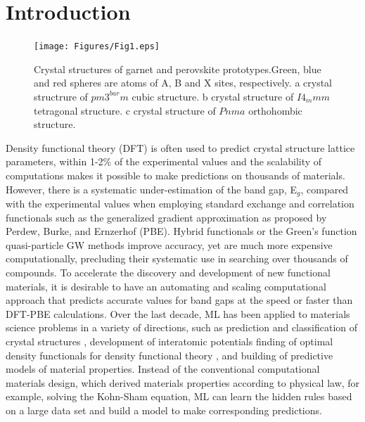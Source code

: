 \documentclass[twocolumn,
superscriptaddress,
 amsmath,amssymb,
 aps, citeautoscript,
prb,
]{revtex4-1}
\begin{document}
\maketitle


\section{Introduction}
 
 \begin{figure}[ht]
\begin{center}
\texttt{[image: Figures/Fig1.eps]}
\end{center}
\caption{ Crystal structures of garnet and perovskite prototypes.Green, blue and red spheres are atoms of A, B and X sites, respectively. a crystal structrure of $pm3^{bar}m$ cubic structure. b crystal structure of $I4_mmm$ tetragonal structure. c crystal structure of $Pnma$ orthohombic structure.}
\label{fig1}
\end{figure}

Density functional theory (DFT)\cite{Kohn1964,Kohn1965}  is often used to predict crystal structure lattice parameters, within 1-2\% of the experimental values and the scalability of computations makes it possible to make predictions on thousands of materials.  However, there is a systematic under-estimation of the band gap, E$_g$, compared with the experimental values when employing standard exchange and correlation functionals such as the generalized gradient approximation as proposed by Perdew, Burke, and Ernzerhof (PBE).  Hybrid functionals  \cite{Heyd2003,Heyd2006} or the Green’s function quasi-particle GW methods \cite{Luoie1996,Kresse2006} improve accuracy, yet are much more expensive computationally, precluding their systematic use in searching over thousands of compounds. To accelerate the discovery and development of new functional materials, it is desirable to have an automating and scaling computational approach that predicts accurate values for band gaps at the speed or faster than DFT-PBE calculations. Over the last decade, ML has been applied to materials science problems in a variety of directions, such as prediction and classification of crystal structures\cite{Fischer2006,CARR2009339,Pilania2015,Yamashita2018} , development of interatomic potentials \cite{Hobday1999,Handley2010,Schneider2017} finding of optimal density functionals for density functional theory \cite{Wellendorff2012,Snyder2012,Brockherde2017,Pilania2013}, and building of predictive models of material properties\cite{Pilania2013,Lee2016,Pilania2016,Bart2017}. Instead of the conventional computational materials design, which derived materials properties according to physical law, for example, solving the Kohn-Sham equation, ML can learn the hidden rules based on a large data set and build a model to make corresponding predictions. 
\end{document}
